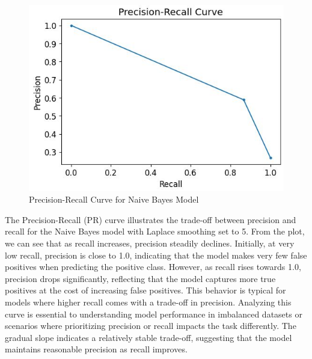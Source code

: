 \begin{figure}[hbt!]
    \centering
    \includegraphics[width=1\linewidth]{Images/6.5e.jpg}
    \caption{Precision-Recall Curve for Naive Bayes Model}
    \label{fig:enter-label}
\end{figure}

The Precision-Recall (PR) curve illustrates the trade-off between precision and recall for the Naive Bayes model with Laplace smoothing set to 5. From the plot, we can see that as recall increases, precision steadily declines. Initially, at very low recall, precision is close to 1.0, indicating that the model makes very few false positives when predicting the positive class. However, as recall rises towards 1.0, precision drops significantly, reflecting that the model captures more true positives at the cost of increasing false positives. This behavior is typical for models where higher recall comes with a trade-off in precision. Analyzing this curve is essential to understanding model performance in imbalanced datasets or scenarios where prioritizing precision or recall impacts the task differently. The gradual slope indicates a relatively stable trade-off, suggesting that the model maintains reasonable precision as recall improves.

